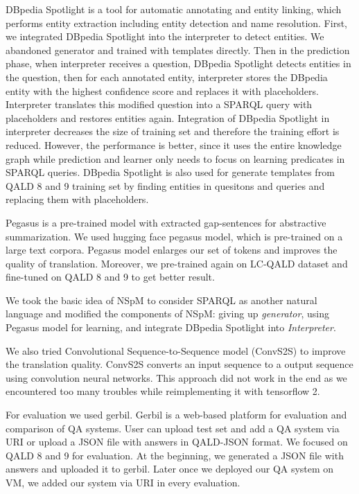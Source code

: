 DBpedia Spotlight\cite{isem2013daiber} is a tool for automatic annotating and entity linking, 
which performs entity extraction including entity detection and name resolution. 
First, we integrated DBpedia Spotlight into the interpreter to detect entities. 
We abandoned generator and trained with templates directly. 
Then in the prediction phase, 
when interpreter receives a question, 
DBpedia Spotlight detects entities in the question,
then for each annotated entity, 
interpreter stores the DBpedia entity with the highest confidence score 
and replaces it with placeholders. 
Interpreter translates this modified question into a SPARQL query with placeholders
and restores entities again. 
Integration of DBpedia Spotlight in interpreter decreases the size of training set
and therefore the training effort is reduced. 
However, the performance is better,
since it uses the entire knowledge graph while prediction
and learner only needs to focus on learning predicates in SPARQL queries. 
DBpedia Spotlight is also used for generate templates from QALD 8 and 9 training set
by finding entities in quesitons and queries and replacing them with placeholders. 

Pegasus\cite{10.5555/3524938.3525989} is a pre-trained model with extracted gap-sentences for abstractive summarization. 
We used hugging face pegasus model, which is pre-trained on a large text corpora. 
Pegasus model enlarges our set of tokens and improves the quality of translation. 
Moreover, we pre-trained again on LC-QALD dataset and fine-tuned on QALD 8 and 9 to get better result.

We took the basic idea of NSpM to consider SPARQL as another natural language
and modified the components of NSpM:
giving up \textit{generator},
using Pegasus model for learning,
and integrate DBpedia Spotlight into \textit{Interpreter}.

We also tried Convolutional Sequence-to-Sequence model (ConvS2S)\cite{DBLP:journals/corr/GehringAGYD17} to improve the translation quality.
ConvS2S converts an input sequence to a output sequence using convolution neural networks. 
This approach did not work in the end
as we encountered too many troubles while reimplementing it with tensorflow 2. 

For evaluation we used gerbil\cite{gerbil}.
Gerbil is a web-based platform for evaluation and comparison of QA systems.
User can upload test set and add a QA system via URI or upload a JSON file with answers in QALD-JSON format. 
We focused on QALD 8 and 9 for evaluation. 
At the beginning, we generated a JSON file with answers and uploaded it to gerbil. 
Later once we deployed our QA system on VM, 
we added our system via URI in every evaluation. 

